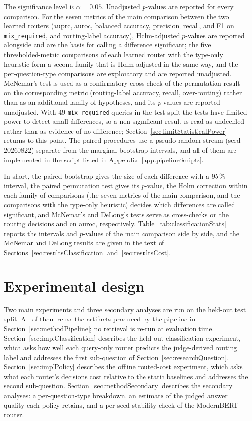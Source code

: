 \documentclass[english, bibtex]{kththesis}               %
\numberwithin{listing}{chapter}
\providecommand{\DIFaddtex}[1]{{\protect\color{blue} \sf #1}} %
\providecommand{\DIFaddbegin}{} %
\providecommand{\DIFaddend}{} %
\providecommand{\DIFadd}[1]{\texorpdfstring{\DIFaddtex{#1}}{#1}} %
\begin{document}
The significance level is $\alpha = 0.05$. Unadjusted $p$-values are reported for every comparison. For the seven metrics of the main comparison between the two learned routers (\gls{auprc}, \gls{auroc}, balanced accuracy, precision, recall, and F1 on \texttt{mix\_required}, and routing-label accuracy), Holm-adjusted $p$-values \cite{holm1979} are reported alongside and are the basis for calling a difference significant; the five thresholded-metric comparisons of each learned router with the type-only heuristic form a second family that is Holm-adjusted in the same way, and the per-question-type comparisons are exploratory and are reported unadjusted. McNemar's test is used as a confirmatory cross-check of the permutation result on the corresponding metric (routing-label accuracy, recall, over-routing) rather than as an additional family of hypotheses, and its $p$-values are reported unadjusted. With $49$ \texttt{mix\_required} queries in the test split the tests have limited power to detect small differences, so a non-significant result is read as undecided rather than as evidence of no difference; Section~\ref{sec:limitStatisticalPower} returns to this point. The paired procedures use a pseudo-random stream (seed $20260822$) separate from the marginal bootstrap intervals, and all of them are implemented in the script listed in Appendix~\ref{app:pipelineScripts}.

\DIFaddbegin \DIFadd{In short, the paired bootstrap gives the size of each difference with a $95\,\%$ interval, the paired permutation test gives its $p$-value, the Holm correction within each family of comparisons (the seven metrics of the main comparison, and the comparisons with the type-only heuristic) decides which differences are called significant, and McNemar's and DeLong's tests serve as cross-checks on the routing decisions and on \gls{auroc}, respectively. Table~\ref{tab:classificationStats} reports the intervals and $p$-values of the main comparison side by side, and the McNemar and DeLong results are given in the text of Sections~\ref{sec:resultsClassification} and~\ref{sec:resultsCost}.
}

\DIFaddend \section{Experimental design}
\label{sec:methodExperiments}

Two main experiments and three secondary analyses are run on the held-out test split. All of them reuse the artifacts produced by the pipeline in Section~\ref{sec:methodPipeline}; no retrieval is re-run at evaluation time. Section~\ref{sec:implClassification} describes the held-out classification experiment, which asks how well each query-only router predicts the judge-derived routing label and addresses the first sub-question of Section~\ref{sec:researchQuestion}. Section~\ref{sec:implPolicy} describes the offline routed-cost experiment, which asks what each router's decisions cost relative to the static baselines and addresses the second sub-question. Section~\ref{sec:methodSecondary} describes the secondary analyses: a per-question-type breakdown, an estimate of the judged answer quality each policy retains, and a per-seed stability check of the ModernBERT router.
\end{document}
